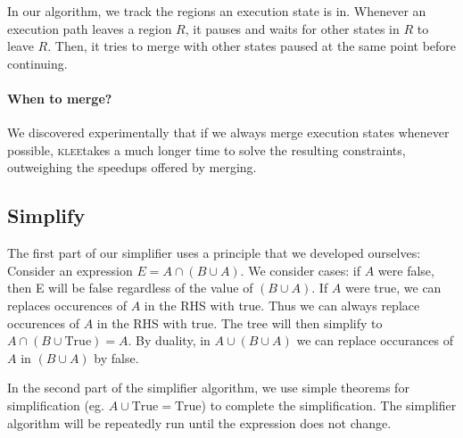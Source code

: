 \documentclass[12pt,a4paper]{article}
\newcommand{\klee}{\textsc{klee}}
\begin{document}
In our algorithm, we track the regions an execution state is in. Whenever an execution path leaves a region $R$, it pauses and waits for other states in $R$ to leave $R$. Then, it tries to merge with other states paused at the same point before continuing.


\paragraph{When to merge?}
We discovered experimentally that if we always merge execution states whenever possible, \klee takes a much longer time to solve the resulting constraints, outweighing the speedups offered by merging.

\subsection{Simplify}
The first part of our simplifier uses a principle that we developed ourselves:
Consider an expression $E = A\cap(B\cup A)$. We consider cases: if $A$ were false, then E will be false regardless of the value of $(B\cup A)$. If $A$ were true, we can replaces occurences of $A$ in the RHS with true. Thus we can always replace occurences of $A$ in the RHS with true. The tree will then simplify to $A\cap(B\cup \text{True}) = A$. By duality, in $A\cup(B\cup A)$ we can replace occurances of $A$ in $(B\cup A)$ by false.

In the second part of the simplifier algorithm, we use simple theorems for simplification (eg. $A\cup \text{True} = \text{True}$) to complete the simplification. The simplifier algorithm will be repeatedly run until the expression does not change.
\end{document}

